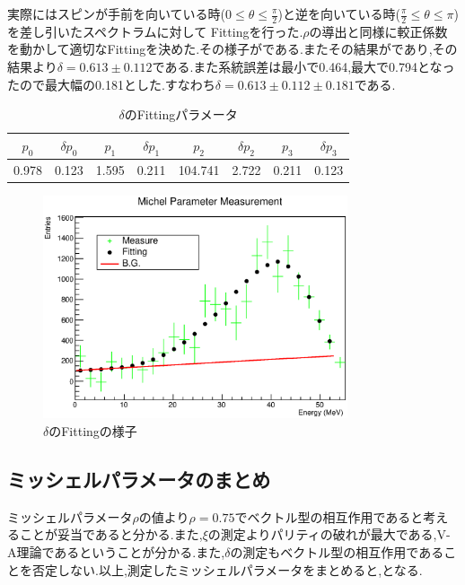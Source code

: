 実際にはスピンが手前を向いている時($0\leq\theta\leq\frac{\pi}{2}$)と逆を向いている時($\frac{\pi}{2}\leq\theta\leq\pi$)を差し引いたスペクトラムに対して
Fittingを行った.$\rho$の導出と同様に較正係数を動かして適切なFittingを決めた.その様子がである.またその結果がであり,その結果より$\delta=0.613\pm0.112$である.また系統誤差は最小で0.464,最大で0.794となったので最大幅の0.181とした.すなわち$\delta=0.613\pm0.112\pm0.181$である.
\begin{table}[bht]
  \centering
  \caption{$\delta$のFittingパラメータ}
  \begin{tabular}{cccccccc}
    $p_0$ & $\delta p_0$ & $p_1$ & $\delta p_1$ & $p_2$ & $\delta p_2$ & $p_3$ & $\delta p_3$ \\ \hline
    0.978 & 0.123 & 1.595 & 0.211 & 104.741 & 2.722 & 0.211 & 0.123 \\
  \end{tabular}
  \label{hatano_tab:delta}
\end{table}

\begin{figure}[bht]
  \centering
  \includegraphics[width=0.8\textwidth]{figure/hatano/delta.eps}
  \caption{$\delta$のFittingの様子}
  \label{hatano_fig:delta}
\end{figure}

\subsection{ミッシェルパラメータのまとめ}
ミッシェルパラメータ$\rho$の値より$\rho=0.75$でベクトル型の相互作用であると考えることが妥当であると分かる.また,$\xi$の測定よりパリティの破れが最大である,V-A理論であるということが分かる.また,$\delta$の測定もベクトル型の相互作用であることを否定しない.以上,測定したミッシェルパラメータをまとめると,となる.

